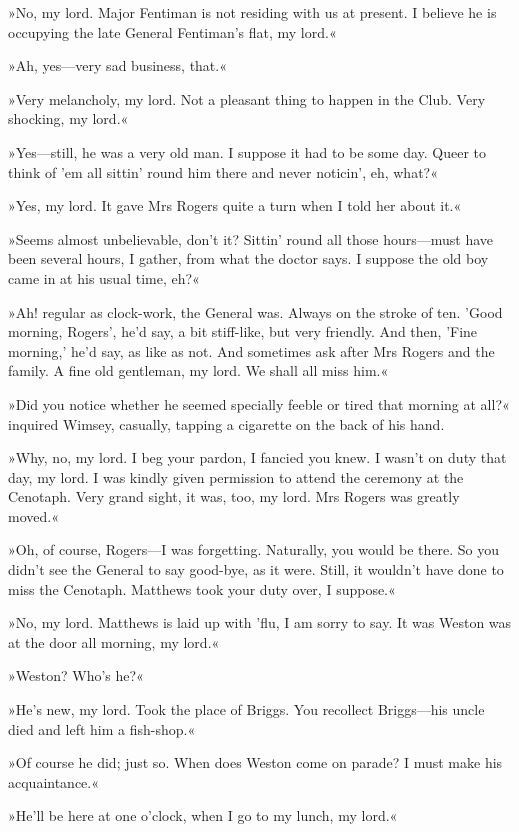 »No, my lord. Major Fentiman is not residing with us at present. I believe he is occupying the late General Fentiman's flat, my lord.«

»Ah, yes—very sad business, that.«

»Very melancholy, my lord. Not a pleasant thing to happen in the Club. Very shocking, my lord.«

»Yes—still, he was a very old man. I suppose it had to be some day. Queer to think of 'em all sittin' round him there and never noticin', eh, what?«

»Yes, my lord. It gave Mrs Rogers quite a turn when I told her about it.«

»Seems almost unbelievable, don't it? Sittin' round all those hours—must have been several hours, I gather, from what the doctor says. I suppose the old boy came in at his usual time, eh?«

»Ah! regular as clock-work, the General was. Always on the stroke of ten. 'Good morning, Rogers', he'd say, a bit stiff-like, but very friendly. And then, 'Fine morning,' he'd say, as like as not. And sometimes ask after Mrs Rogers and the family. A fine old gentleman, my lord. We shall all miss him.«

»Did you notice whether he seemed specially feeble or tired that morning at all?« inquired Wimsey, casually, tapping a cigarette on the back of his hand.

»Why, no, my lord. I beg your pardon, I fancied you knew. I wasn't on duty that day, my lord. I was kindly given permission to attend the ceremony at the Cenotaph. Very grand sight, it was, too, my lord. Mrs Rogers was greatly moved.«

»Oh, of course, Rogers—I was forgetting. Naturally, you would be there. So you didn't see the General to say good-bye, as it were. Still, it wouldn't have done to miss the Cenotaph. Matthews took your duty over, I suppose.«

»No, my lord. Matthews is laid up with 'flu, I am sorry to say. It was Weston was at the door all morning, my lord.«

»Weston? Who's he?«

»He's new, my lord. Took the place of Briggs. You recollect Briggs—his uncle died and left him a fish-shop.«

»Of course he did; just so. When does Weston come on parade? I must make his acquaintance.«

»He'll be here at one o'clock, when I go to my lunch, my lord.«

